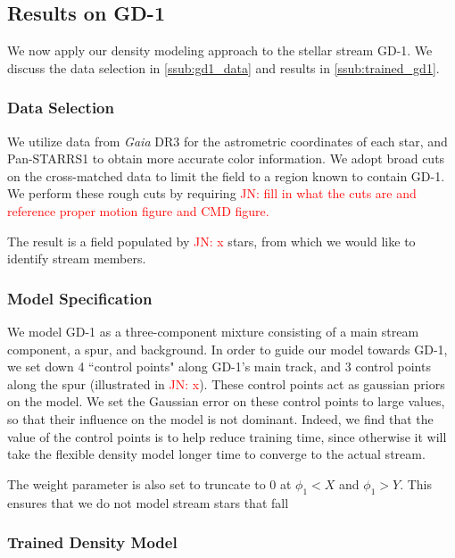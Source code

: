 \documentclass[twocolumn]{aastex631}
\newcommand{\JN}[1]{{\textcolor{red}{JN: #1}}}
\begin{document}
    
    \subsection{Results on GD-1} \label{sub:gd1}

        We now apply our density modeling approach to the stellar stream GD-1. We discuss the data selection in \autoref{ssub:gd1_data} and results in \autoref{ssub:trained_gd1}.
        
        \subsubsection{Data Selection} \label{ssub:gd1_data}
            We utilize data from {\it Gaia} DR3 for the astrometric coordinates of each star, and Pan-STARRS1 to obtain more accurate color information. We adopt broad cuts on the cross-matched data to limit the field to a region known to contain GD-1. We perform these rough cuts by requiring \JN{fill in what the cuts are and reference proper motion figure and CMD figure.} 

            The result is a field populated by \JN{x} stars, from which we would like to identify stream members.

        \subsubsection{Model Specification}\label{sec:GD_1_ModelSpecification}
    
            We model GD-1 as a three-component mixture consisting of a main stream component, a spur, and background. In order to guide our model towards GD-1, we set down 4 ``control points" along GD-1's main track, and 3 control points along the spur (illustrated in \JN{x}). These control points act as gaussian priors on the model. We set the Gaussian error on these control points to large values, so that their influence on the model is not dominant. Indeed, we find that the value of the control points is to help reduce training time, since otherwise it will take the flexible density model longer time to converge to the actual stream.
    
            The weight parameter is also set to truncate to $0$ at $\phi_1 < X$ and $\phi_1 > Y$. This ensures that we do not model stream stars that fall 
        
        
        \subsubsection{Trained Density Model}\label{ssub:trained_gd1}
    
\end{document}
